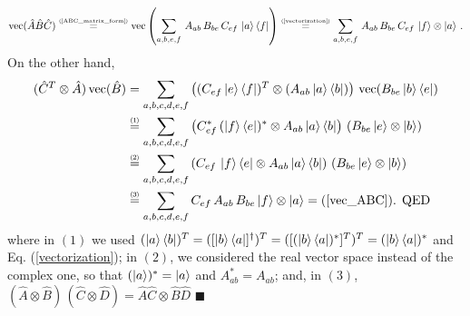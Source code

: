 \documentclass[11pt]{article}
\numberwithin{equation}{section} %
\numberwithin{figure}{section} %
\newcommand\numeq[1] %
  {\stackrel{\scriptscriptstyle(\mkern-1.5mu#1\mkern-1.5mu)}{=}}
\begin{document}
\begin{appendices}
\begin{equation}
\textrm{vec}(\hat{A}\hat{B}\hat{C}) \numeq{\textrm{\ref{ABC_matrix_form}}} \textrm{vec}\left(\sum_{a,b,e,f}\,A_{ab}\,B_{be}\,C_{ef}\,\ket{a}\bra{f}\right) \numeq{\textrm{\ref{vectorization}}} \sum_{a,b,e,f} \,A_{ab}\,B_{be}\,C_{ef}\,\ket{f}\otimes\ket{a}\,\textrm{.}
\end{equation}
On the other hand, 
\begin{equation}
\begin{split}
(\hat{C}^T \otimes\hat{A})\,\textrm{vec}(\hat{B})
&=\sum_{a,b,c,d,e,f}\left((C_{ef}\ket{e}\bra{f})^T \otimes(A_{ab}\ket{a}\bra{b})\right)\,\textrm{vec}(B_{be}\ket{b}\bra{e})\\ 
&\numeq{1} \sum_{a,b,c,d,e,f} \left( C_{ef}^*\,(\ket{f}\bra{e})^* \otimes A_{ab}\ket{a}\bra{b} \right)\, (B_{be}\ket{e}\otimes\ket{b})\\
&\numeq{2} \sum_{a,b,c,d,e,f} \left( C_{ef}\,\ket{f}\bra{e} \otimes A_{ab}\ket{a}\bra{b} \right)\, (B_{be}\ket{e}\otimes\ket{b}) \\
&\numeq{3} \sum_{a,b,c,d,e,f}  C_{ef}\,A_{ab}\,B_{be}\ket{f} \otimes \ket{a} = \textrm{(\ref{vec_ABC}). QED}
\end{split}
\end{equation}
where in $(1)$ we used $(\ket{a}\bra{b})^T=([\ket{b}\bra{a}]^\dagger)^T = ([(\ket{b}\bra{a})^*]^T)^T = (\ket{b}\bra{a})^* $ and Eq. (\ref{vectorization}); in $(2)$, we considered the real vector space instead of the complex one, so that $(\ket{a})^*=\ket{a}$ and $A_{ab}^*=A_{ab}$; and, in $(3)$, $(\hat{A}\otimes\hat{B})\,(\hat{C}\otimes\hat{D})=\hat{A}\hat{C}\otimes\hat{B}\hat{D}$  $\blacksquare$\\


\end{appendices}
\end{document}
